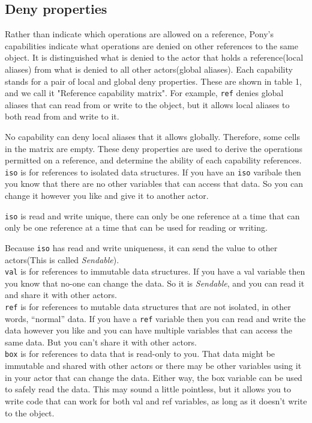 \documentclass{article}
\begin{document}
\begin{multicols}{2}
\subsection{Deny properties}
Rather than indicate which operations are allowed on a reference, Pony's capabilities indicate what operations are denied on other references to the same object. It is distinguished what is denied to the actor that holds a reference(local aliases) from what is denied to all other actors(global aliases). Each capability stands for a pair of local and global deny properties.
These are shown in table 1\cite{type-proof-paper}, and we call it "Reference capability matrix". For example, \texttt{ref} denies global aliases that can read from or write to the object, but it allows local aliases to both read from and write to it.

No capability can deny local aliases that it allows globally.  Therefore, some cells in the matrix are empty.
These deny properties are used to derive the operations permitted on a reference, and determine the ability of each capability references. \\

\texttt{iso} is for references to isolated data structures. If you have an \texttt{iso} varibale then you know that there are no other variables that can access that data. So you can change it however you like and give it to another actor. 

\texttt{iso} is read and write unique, there can only be one reference at a time that can only be one reference at a time that can be used for reading or writing.

Because \texttt{iso} has read and write uniqueness, it can send the value to other actors(This is called \textit{Sendable}).\\

\texttt{val} is for references to immutable data structures. If you have a val variable then you know that no-one can change the data. So it is \textit{Sendable}, and you can read it and share it with other actors.\\


\texttt{ref}  is for references to mutable data structures that are not isolated, in other words, “normal” data. If you have a \texttt{ref} variable then you can read and write the data however you like and you can have multiple variables that can access the same data. But you can’t share it with other actors.\\

\texttt{box} is for references to data that is read-only to you. That data might be immutable and shared with other actors or there may be other variables using it in your actor that can change the data. Either way, the box variable can be used to safely read the data. This may sound a little pointless, but it allows you to write code that can work for both val and ref variables, as long as it doesn’t write to the object.\\


\end{multicols}
\end{document}
